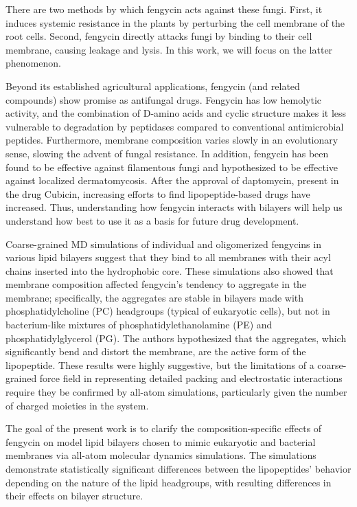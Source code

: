 There are two methods by which fengycin acts against these fungi. First, it
induces systemic resistance in the plants by perturbing the cell membrane of
the root cells.\cite{Jacques2007,Thonart2007} Second, fengycin directly attacks
fungi by binding to their cell membrane, causing leakage and
lysis.\cite{Seelig2007,Heerklotz2011,Nylander2008,Nylander2005} In this work, we
will focus on the latter phenomenon.

Beyond its established agricultural applications, fengycin (and related
compounds) show promise as antifungal drugs. Fengycin has low hemolytic
activity, and the combination of D-amino acids and cyclic structure makes it
less vulnerable to degradation by peptidases compared to conventional antimicrobial peptides.
\cite{Jung1986} Furthermore, membrane composition varies slowly in an evolutionary sense,
slowing the advent of fungal resistance. In addition, fengycin has been found to be effective
against filamentous fungi and hypothesized to be effective against
localized dermatomycosis.\cite{Dufrene2005,Deleu2013} After the approval of daptomycin,
present in the drug Cubicin, increasing efforts to find lipopeptide-based drugs
have increased.\cite{Kirkpatrick2003} Thus, understanding how fengycin interacts with bilayers will
help us understand how best to use it as a basis for future drug development.

Coarse-grained MD simulations of individual and oligomerized fengycins in
various lipid bilayers suggest that they bind to all membranes with their acyl
chains inserted into the hydrophobic core.\cite{HornGrossfield2013} These
simulations also showed that membrane composition affected fengycin's tendency
to aggregate in the membrane; specifically, the aggregates are stable in
bilayers made with phosphatidylcholine (PC) headgroups (typical of eukaryotic
cells), but not in bacterium-like mixtures of phosphatidylethanolamine (PE) and
phosphatidylglycerol (PG). The authors hypothesized that the aggregates, which
significantly bend and distort the membrane, are the active form of the
lipopeptide.
These results were highly suggestive, but the limitations of a coarse-grained force field in
representing detailed packing and electrostatic interactions require they be
confirmed by all-atom simulations, particularly given the number of charged moieties in the system.

The goal of the present work is to clarify the composition-specific
effects of fengycin on model lipid bilayers chosen to mimic eukaryotic
and bacterial membranes via all-atom molecular dynamics simulations.
The simulations demonstrate statistically significant differences
between the lipopeptides' behavior depending on the nature of the
lipid headgroups, with resulting differences in their effects on bilayer structure.

